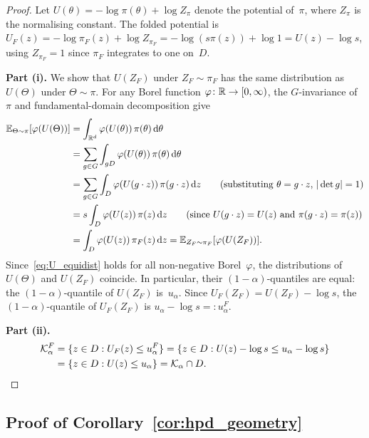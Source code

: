 \begin{proof}
  Let $U(\theta) = -\log\pi(\theta) + \log Z_\pi$ denote the
  potential of~$\pi$, where $Z_\pi$ is the normalising constant.
  The folded potential is
  $U_F(z) = -\log\pi_F(z) + \log Z_{\pi_F}
  = -\log(s\pi(z)) + \log 1 = U(z) - \log s$,
  using $Z_{\pi_F} = 1$ since $\pi_F$ integrates to one on~$D$.

  \textbf{Part (i).}
  We show that $U(Z_F)$ under $Z_F \sim \pi_F$ has the same
  distribution as $U(\Theta)$ under $\Theta \sim \pi$.
  For any Borel function $\varphi\colon \mathbb{R} \to [0,\infty)$,
  the $G$-invariance of~$\pi$ and fundamental-domain decomposition
  give
  \begin{align}
    \mathbb{E}_{\Theta \sim \pi}[\varphi(U(\Theta))]
    &= \int_{\mathbb{R}^d} \varphi(U(\theta))\,\pi(\theta)\,\mathrm{d}\theta
    \notag \\
    &= \sum_{g \in G} \int_{gD}
       \varphi(U(\theta))\,\pi(\theta)\,\mathrm{d}\theta
    \notag \\
    &= \sum_{g \in G} \int_D
       \varphi(U(g \cdot z))\,\pi(g \cdot z)\,\mathrm{d}z
       \qquad\text{(substituting $\theta = g \cdot z$, $|\det g| = 1$)}
    \notag \\
    &= s \int_D \varphi(U(z))\,\pi(z)\,\mathrm{d}z
       \qquad\text{(since $U(g \cdot z) = U(z)$ and $\pi(g \cdot z) = \pi(z)$)}
    \notag \\
    &= \int_D \varphi(U(z))\,\pi_F(z)\,\mathrm{d}z
    = \mathbb{E}_{Z_F \sim \pi_F}[\varphi(U(Z_F))].
    \label{eq:U_equidist}
  \end{align}
  Since~\eqref{eq:U_equidist} holds for all non-negative
  Borel~$\varphi$, the distributions of $U(\Theta)$ and $U(Z_F)$
  coincide.  In particular, their $(1{-}\alpha)$-quantiles are
  equal: the $(1{-}\alpha)$-quantile of $U(Z_F)$ is~$u_\alpha$.
  Since $U_F(Z_F) = U(Z_F) - \log s$, the $(1{-}\alpha)$-quantile
  of $U_F(Z_F)$ is $u_\alpha - \log s =: u_\alpha^F$.

  \textbf{Part (ii).}
  \begin{align*}
    \mathcal{K}_\alpha^F
    &= \{z \in D : U_F(z) \leq u_\alpha^F\}
    = \{z \in D : U(z) - \log s \leq u_\alpha - \log s\} \\
    &= \{z \in D : U(z) \leq u_\alpha\}
    = \mathcal{K}_\alpha \cap D. \qedhere
  \end{align*}
\end{proof}


\subsection{Proof of Corollary~\ref{cor:hpd_geometry}}
\label{app:proof_hpd_cor}

